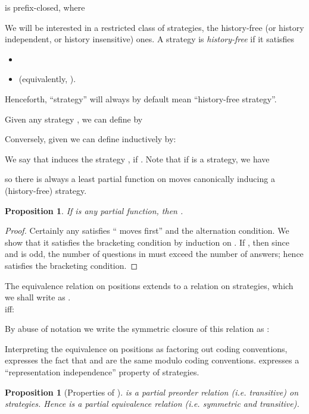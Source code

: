 \documentclass[11pt]{article}
\newtheorem{proposition}[theorem]{Proposition}
\begin{document}
is prefix-closed, where

We will be interested in a restricted class of strategies, the history-free
(or history independent, or history insensitive) ones.
A strategy  is {\em history-free} if it satisfies
\begin{itemize}
\item 
\item  (equivalently, ).
\end{itemize}
Henceforth, ``strategy'' will always by default mean ``history-free strategy''.

Given any strategy , we can define  by

Conversely, given  we can define
 inductively by:

We say that  induces the strategy
, if . Note that if
 is a strategy, we have

so there is always a least partial function on moves canonically inducing a
(history-free) strategy.

\begin{proposition}
If  is any partial function, then
.
\end{proposition}

\begin{proof} Certainly any  satisfies ``
moves first'' and the alternation condition. We show that it
satisfies the bracketing condition by induction on . If , then since  and  is odd, the number of
questions in  must exceed the number of answers; hence 
satisfies the bracketing condition.
\end{proof}

The equivalence relation on positions extends to a relation on
strategies, which we shall write as . \\
 iff:


By abuse of notation we write the symmetric closure of this relation
as :


Interpreting the equivalence on positions as factoring out coding conventions,
 expresses the fact that  and 
are the same modulo
coding conventions.   expresses a
``representation independence'' property of strategies.

\begin{proposition} [Properties of ] \hfill

 is a partial preorder relation (i.e. transitive) on
  strategies.
Hence  is a partial equivalence relation (i.e. symmetric and transitive).

\end{proposition}
\end{document}
